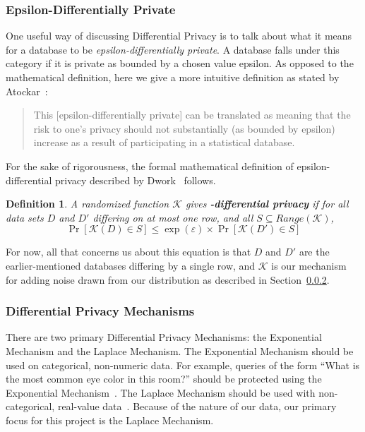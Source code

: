 \documentclass[conference,11pt]{IEEEtran}
\newtheorem{definition}{Definition}
\begin{document}
\subsubsection{Epsilon-Differentially Private}\label{sec:epsilon-dp}
One useful way of discussing Differential Privacy is to talk about what it means
for a database to be \textit{epsilon-differentially private}. A database falls
under this category if it is private as bounded by a chosen value epsilon. As
opposed to the mathematical definition, here we give a more intuitive definition
as stated by Atockar~\cite{Atockar:2014}:

\blockquote{%
    This [epsilon-differentially private] can be translated as meaning that the
    risk to one's privacy should not substantially (as bounded by epsilon)
    increase as a result of participating in a statistical database.
}

For the sake of rigorousness, the formal mathematical definition of
epsilon-differential privacy described by Dwork~\cite{Dwork:2006:DP} follows.

\begin{mdframed}
    \begin{definition}
        A randomized function $\mathcal{K}$ gives
        \textbf{\textepsilon-differential privacy} if for all data sets $D$ and
        $D'$ differing on at most one row, and all $S \subseteq
        Range(\mathcal{K})$,
        \begin{equation}
            \Pr[\mathcal{K}(D) \in S] \leq \exp(\varepsilon) \times
            \Pr[\mathcal{K}(D') \in S]
        \end{equation}
    \end{definition}
\end{mdframed}

For now, all that concerns us about this equation is that $D$ and $D'$ are the
earlier-mentioned databases differing by a single row, and $\mathcal{K}$ is our
mechanism for adding noise drawn from our distribution as described in
Section~\ref{sec:dp-mech}.

\subsubsection{Differential Privacy Mechanisms}\label{sec:dp-mech}
There are two primary Differential Privacy Mechanisms: the Exponential Mechanism
and the Laplace Mechanism. The Exponential Mechanism should be used on
categorical, non-numeric data. For example, queries of the form ``What is the
most common eye color in this room?'' should be protected using the Exponential
Mechanism~\cites{Atockar:2014}[8]{Roth:2011:DP-exp}. The Laplace Mechanism should be used with
non-categorical, real-value data~\cite{Geng:2014}. Because of the nature of our
data, our primary focus for this project is the Laplace Mechanism.
\end{document}

